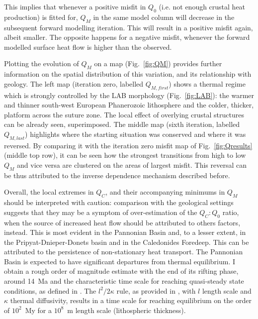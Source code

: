 This implies that whenever a positive misfit in $Q_0$ (i.e. not enough crustal heat production) is fitted for, $Q_M$ in the same model column will decrease in the subsequent forward modelling iteration.
This will result in a positive misfit again, albeit smaller.
The opposite happens for a negative misfit, whenever the forward modelled surface heat flow is higher than the observed.

Plotting the evolution of $Q_M$ on a map (Fig.~\ref{fig:QM}) provides further information on the spatial distribution of this variation, and its relationship with geology.
The left map (iteration zero, labelled $Q_{M,first}$) shows a thermal regime which is strongly controlled by the LAB morphology (Fig.~\ref{fig:LAB}): the warmer and thinner south-west European Phanerozoic lithosphere and the colder, thicker, platform across the suture zone.
The local effect of overlying crustal structures can be already seen, superimposed.
The middle map (sixth iteration, labelled $Q_{M,last}$) highlights where the starting situation was conserved and where it was reversed.
By comparing it with the iteration zero misfit map of Fig.~\ref{fig:Qresults} (middle top row), it can be seen how the strongest transitions from high to low $Q_M$ and vice versa are clustered on the areas of largest misfit.
This reversal can be thus attributed to the inverse dependence mechanism described before.

Overall, the local extremes in $Q_C$, and their accompanying minimums in $Q_M$ should be interpreted with caution: comparison with the geological settings suggests that they may be a symptom of over-estimation of the $Q_C:Q_0$ ratio, when the source of increased heat flow should be attributed to others factors, instead.
This is most evident in the Pannonian Basin and, to a lesser extent, in the Pripyat-Dnieper-Donets basin and in the Caledonides Foredeep.
This can be attributed to the persistence of non-stationary heat transport.
The Pannonian Basin is expected to have significant departures from thermal equilibrium.
I obtain a rough order of magnitude estimate with the end of its rifting phase, around 14~Ma \parencite{Horvath2015} and the characteristic time scale for reaching quasi-steady state conditions, as defined in \parencite{stuwe2007geodynamics}.
The $l^2 / 2\kappa$ rule, as provided in \textcite{stuwe2007geodynamics}, with $l$ length scale and $\kappa$ thermal diffusivity, results in a time scale for reaching equilibrium on the order of $10^2$~My for a $10^8$~m length scale (lithospheric thickness).

